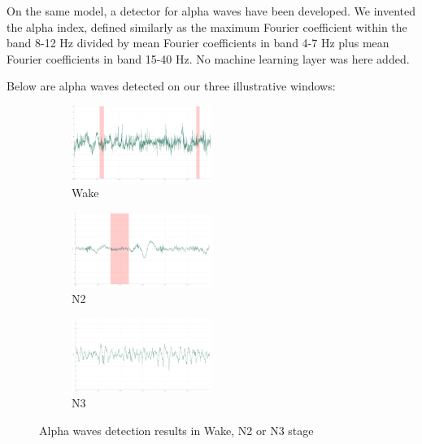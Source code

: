 \documentclass[12pt]{report}
\begin{document}
On the same model, a detector for alpha waves have been developed. We invented the alpha index, defined similarly as the maximum Fourier coefficient within the band 8-12 Hz divided by mean Fourier coefficients in band 4-7 Hz plus mean Fourier coefficients in band 15-40 Hz. No machine learning layer was here added.

Below are alpha waves detected on our three illustrative windows:
\begin{figure}[H]
\begin{subfigure}{1.\textwidth}
	\centering
	\includegraphics[width=0.5\textwidth]{img/chap2/wake_alphab.png}
	\caption{Wake}
	\label{fig:wake_window_alpha}
\end{subfigure}

\begin{subfigure}{1.\textwidth}
	\centering
	\includegraphics[width=0.5\textwidth]{img/chap2/n2_alphab.png}
	\caption{N2}
	\label{fig:n2_window_alpha}
\end{subfigure}

\begin{subfigure}{1.\textwidth}
	\centering
  	\includegraphics[width=0.5\textwidth]{img/chap2/n3_alphab.png}
	\caption{N3}
	\label{fig:n3_window_alpha}
\end{subfigure}

\caption{\label{fig:3windows_alpha}Alpha waves detection results in Wake, N2 or N3 stage}
\end{figure}
\end{document}
